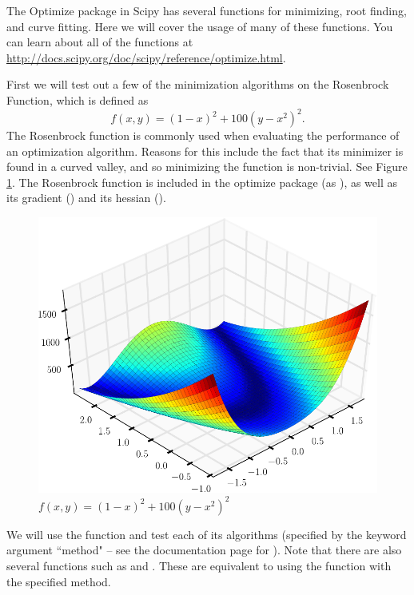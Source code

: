 \label{lab:Optimization1}

The Optimize package in Scipy has several functions for minimizing, root finding, and curve fitting. Here we will cover the usage of many of these functions.
You can learn about all of the functions at \url{http://docs.scipy.org/doc/scipy/reference/optimize.html}.

First we will test out a few of the minimization algorithms on the Rosenbrock Function, which is defined as
\[
f(x,y) = (1-x)^2 + 100(y-x^2)^2.
\]
The Rosenbrock function is commonly used when evaluating the performance of an optimization algorithm.
Reasons for this include the fact that its minimizer is found in a curved valley, and so minimizing the function is non-trivial.
See Figure \ref{opt:rosenbrock}.
The Rosenbrock function is included in the optimize package (as ), as well as its gradient () and its hessian ().

\begin{figure}
\includegraphics[width=\textwidth]{Rosenbrock.pdf}
\caption{$f(x,y) = (1-x)^2 + 100(y-x^2)^2$}
\label{opt:rosenbrock}
\end{figure}

We will use the  function and test each of its algorithms (specified by the keyword argument ``method" -- see the documentation page for ).
Note that there are also several functions such as  and . These are equivalent to using the  function with the specified method.

